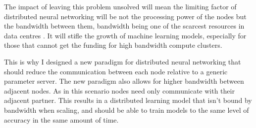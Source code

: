 \par
The impact of leaving this problem unsolved will mean the limiting factor of
distributed neural networking will be not the processing power of the nodes but
the bandwidth between them, bandwidth being one of the scarcest resources in
data centres \cite{LuizDatacenterAsAComputer}. It will stifle the growth of
machine learning models, especially for those that cannot get the funding for high
bandwidth compute clusters.

This is why I designed a new paradigm for distributed neural networking that
should reduce the communication between each node relative to a generic
parameter server. The new paradigm also allows for higher bandwidth between
adjacent nodes. As in this scenario nodes need only communicate with their
adjacent partner. This results in a distributed learning model that isn't bound
by bandwidth when scaling, and should be able to train models to the same level
of accuracy in the same amount of time.


